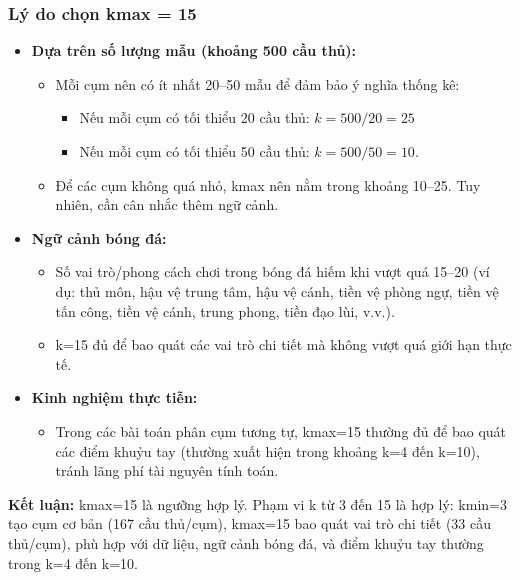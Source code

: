 \documentclass[12pt, a4paper]{report}
\begin{document}
\subsubsection*{Lý do chọn kmax = 15}
\begin{itemize}
    \item \textbf{Dựa trên số lượng mẫu (khoảng 500 cầu thủ):}
    \begin{itemize}
        \item Mỗi cụm nên có ít nhất 20–50 mẫu để đảm bảo ý nghĩa thống kê:
        \begin{itemize}
            \item Nếu mỗi cụm có tối thiểu 20 cầu thủ: $k = 500/20 = 25$
            \item Nếu mỗi cụm có tối thiểu 50 cầu thủ: $k = 500/50 = 10$. 
        \end{itemize}
        \item Để các cụm không quá nhỏ, kmax nên nằm trong khoảng 10–25. Tuy nhiên, cần cân nhắc thêm ngữ cảnh.
    \end{itemize}
    \item \textbf{Ngữ cảnh bóng đá:}
    \begin{itemize}
        \item Số vai trò/phong cách chơi trong bóng đá hiếm khi vượt quá 15–20 (ví dụ: thủ môn, hậu vệ trung tâm, hậu vệ cánh, tiền vệ phòng ngự, tiền vệ tấn công, tiền vệ cánh, trung phong, tiền đạo lùi, v.v.).
        \item k=15 đủ để bao quát các vai trò chi tiết mà không vượt quá giới hạn thực tế.
    \end{itemize}
    \item \textbf{Kinh nghiệm thực tiễn:}
    \begin{itemize}
        \item Trong các bài toán phân cụm tương tự, kmax=15 thường đủ để bao quát các điểm khuỷu tay (thường xuất hiện trong khoảng k=4 đến k=10), tránh lãng phí tài nguyên tính toán.
    \end{itemize}
\end{itemize}
\textbf{Kết luận:} kmax=15 là ngưỡng hợp lý.
Phạm vi k từ 3 đến 15 là hợp lý: kmin=3 tạo cụm cơ bản (167 cầu thủ/cụm), kmax=15 bao quát vai trò chi tiết (33 cầu thủ/cụm), phù hợp với dữ liệu, ngữ cảnh bóng đá, và điểm khuỷu tay thường trong k=4 đến k=10.
\end{document}

